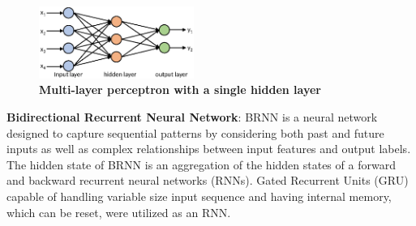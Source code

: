\documentclass{amia}
\begin{document}
\begin{figure}[!htb]
    \centering
    \includegraphics[width=0.45\textwidth]{figures/mlp.eps}
    \caption{\textbf{Multi-layer perceptron with a single hidden layer}}
    \label{fig:mlp}
\end{figure}

\textbf{Bidirectional Recurrent Neural Network}: BRNN is a neural network designed to capture sequential patterns by considering both past  and future inputs as well as complex relationships between input features and output labels.\cite{schuster1997bidirectional} The hidden state of BRNN is an aggregation of the hidden states of a forward and backward recurrent neural networks (RNNs). Gated Recurrent Units (GRU)\cite{chung2014empirical} capable of handling variable size input sequence and having internal memory, which can be reset, were utilized as an RNN. %
\end{document}
